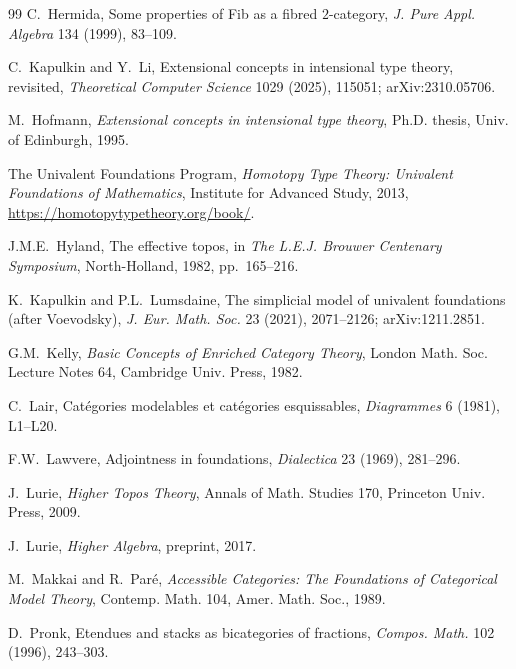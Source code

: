 \documentclass[11pt]{article}
\theoremstyle{plain}
\theoremstyle{definition}
\begin{document}
\begin{thebibliography}{99}
C.~Hermida,
\newblock Some properties of Fib as a fibred $2$-category,
\newblock \emph{J. Pure Appl. Algebra} 134 (1999), 83--109.

C.~Kapulkin and Y.~Li,
\newblock Extensional concepts in intensional type theory, revisited,
\newblock \emph{Theoretical Computer Science} 1029 (2025), 115051; arXiv:2310.05706.

M.~Hofmann,
\newblock \emph{Extensional concepts in intensional type theory},
\newblock Ph.D. thesis, Univ. of Edinburgh, 1995.

The Univalent Foundations Program,
\newblock \emph{Homotopy Type Theory: Univalent Foundations of Mathematics},
\newblock Institute for Advanced Study, 2013,
\newblock \url{https://homotopytypetheory.org/book/}.

J.M.E.~Hyland,
\newblock The effective topos,
\newblock in \emph{The L.E.J. Brouwer Centenary Symposium}, North-Holland, 1982, pp.~165--216.

K.~Kapulkin and P.L.~Lumsdaine,
\newblock The simplicial model of univalent foundations (after Voevodsky),
\newblock \emph{J. Eur. Math. Soc.} 23 (2021), 2071--2126; arXiv:1211.2851.

G.M.~Kelly,
\newblock \emph{Basic Concepts of Enriched Category Theory},
\newblock London Math. Soc. Lecture Notes 64, Cambridge Univ. Press, 1982.

C.~Lair,
\newblock Cat\'egories modelables et cat\'egories esquissables,
\newblock \emph{Diagrammes} 6 (1981), L1--L20.

F.W.~Lawvere,
\newblock Adjointness in foundations,
\newblock \emph{Dialectica} 23 (1969), 281--296.

J.~Lurie,
\newblock \emph{Higher Topos Theory},
\newblock Annals of Math. Studies 170, Princeton Univ. Press, 2009.

J.~Lurie,
\newblock \emph{Higher Algebra},
\newblock preprint, 2017.

M.~Makkai and R.~Par\'e,
\newblock \emph{Accessible Categories: The Foundations of Categorical Model Theory},
\newblock Contemp. Math. 104, Amer. Math. Soc., 1989.

D.~Pronk,
\newblock Etendues and stacks as bicategories of fractions,
\newblock \emph{Compos. Math.} 102 (1996), 243--303.


\end{thebibliography}
\end{document}
